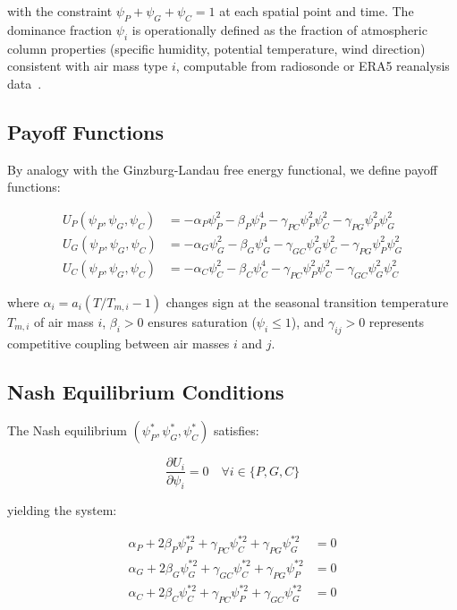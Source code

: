 \documentclass[gmd, manuscript]{copernicus}
\begin{document}
with the constraint $\psi_P + \psi_G + \psi_C = 1$ at each spatial
point and time. The dominance fraction $\psi_i$ is operationally
defined as the fraction of atmospheric column properties (specific
humidity, potential temperature, wind direction) consistent with
air mass type $i$, computable from radiosonde or ERA5 reanalysis~\citep{Hersbach2020} data~\citep{Hersbach2020}.

\subsection{Payoff Functions}

By analogy with the Ginzburg-Landau free energy functional, we define
payoff functions:

\begin{align}
U_P(\psi_P, \psi_G, \psi_C) &= -\alpha_P\psi_P^2 - \beta_P\psi_P^4
  - \gamma_{PC}\psi_P^2\psi_C^2 - \gamma_{PG}\psi_P^2\psi_G^2 \\
U_G(\psi_P, \psi_G, \psi_C) &= -\alpha_G\psi_G^2 - \beta_G\psi_G^4
  - \gamma_{GC}\psi_G^2\psi_C^2 - \gamma_{PG}\psi_P^2\psi_G^2 \\
U_C(\psi_P, \psi_G, \psi_C) &= -\alpha_C\psi_C^2 - \beta_C\psi_C^4
  - \gamma_{PC}\psi_P^2\psi_C^2 - \gamma_{GC}\psi_G^2\psi_C^2
\end{align}

where $\alpha_i = a_i(T/T_{m,i} - 1)$ changes sign at the seasonal
transition temperature $T_{m,i}$ of air mass $i$, $\beta_i > 0$
ensures saturation ($\psi_i \leq 1$), and $\gamma_{ij} > 0$ represents
competitive coupling between air masses $i$ and $j$.

\subsection{Nash Equilibrium Conditions}

The Nash equilibrium $(\psi_P^*, \psi_G^*, \psi_C^*)$ satisfies:

\begin{equation}
\frac{\partial U_i}{\partial \psi_i} = 0 \quad \forall i \in \{P,G,C\}
\end{equation}

yielding the system:

\begin{align}
\alpha_P + 2\beta_P\psi_P^{*2} + \gamma_{PC}\psi_C^{*2}
  + \gamma_{PG}\psi_G^{*2} &= 0 \\
\alpha_G + 2\beta_G\psi_G^{*2} + \gamma_{GC}\psi_C^{*2}
  + \gamma_{PG}\psi_P^{*2} &= 0 \\
\alpha_C + 2\beta_C\psi_C^{*2} + \gamma_{PC}\psi_P^{*2}
  + \gamma_{GC}\psi_G^{*2} &= 0
\end{align}
\end{document}
